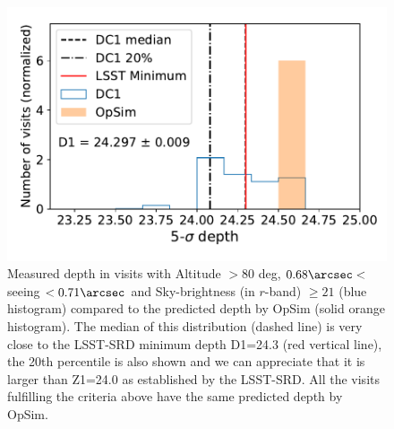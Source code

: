 \documentclass[\docopts]{\docclass}
\begin{document}
\begin{figure}
\centering
\includegraphics[width=0.85\columnwidth]{m5_goals}
\caption{Measured depth in visits with Altitude $>80$ deg, $0.68 \arcsec <$ seeing $ < 0.71 \arcsec$ and Sky-brightness (in $r$-band) $\geq 21$ (blue histogram) compared to the predicted depth by OpSim (solid orange histogram). The median of this distribution (dashed line) is very close to the LSST-SRD minimum depth D1=24.3 (red vertical line), the 20th percentile is also shown and we can appreciate that it is larger than Z1=24.0 as established by the LSST-SRD. All the visits fulfilling the criteria above have the same predicted depth by OpSim.}
\label{fig:DF1_checks}
\end{figure}
\end{document}
